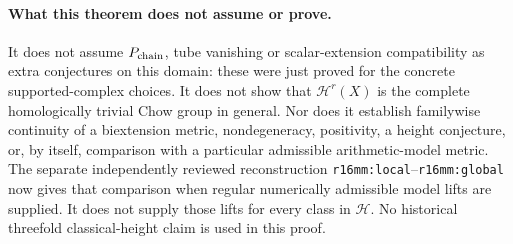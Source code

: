 \paragraph{What this theorem does not assume or prove.}
It does not assume $P_{\rm chain}$, tube vanishing or scalar-extension
compatibility as extra conjectures on this domain: these were just
proved for the concrete supported-complex choices. It does not show
that $\mathcal H^r(X)$ is the complete homologically trivial Chow
group in general. Nor does it establish familywise continuity of a
biextension metric, nondegeneracy, positivity, a height conjecture,
or, by itself, comparison with a particular admissible
arithmetic-model metric. The separate independently reviewed
reconstruction \texttt{r16mm:local}--\texttt{r16mm:global} now gives
that comparison when regular numerically admissible model lifts
are supplied. It does not supply those lifts for every class in
$\mathcal H$. No historical threefold classical-height claim is
used in this proof.

